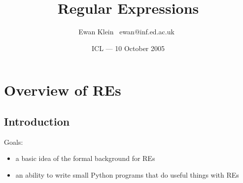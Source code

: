 % 
%

% 

\title{Regular Expressions}
\author{Ewan Klein \newline \mbox{ }ewan@inf.ed.ac.uk\mbox{ }}
\date{ICL --- 10 October 2005}



\usepackage{fancybox}
\usepackage{color}
\usepackage{amsmath}
\usepackage{graphicx}
\usepackage{alltt}
\usepackage{url}


\newcommand{\Hilite}[1]{\colorbox{yellow}{#1}}
\newcommand{\Shade}[1]{\colorbox{light}{#1}}


\newcommand{\Comment}[1]{\textcolor{blue}{#1}}
\newcommand{\Em}[1]{\textcolor{red}{#1}}
\newcommand{\Dim}[1]{\textcolor{gray}{#1}}

\setlength{\parskip}{0in}
\setlength{\parindent}{0in}




\frame{\titlepage}




\frame{\tableofcontents}


\section{Overview of REs}

\subsection{Introduction}

\begin{frame}[fragile]

Goals: 
\begin{itemize}
  \item a basic idea of the formal background for REs
  \item an ability to write small Python programs that do 
useful things with REs
\end{itemize}

\end{frame}

